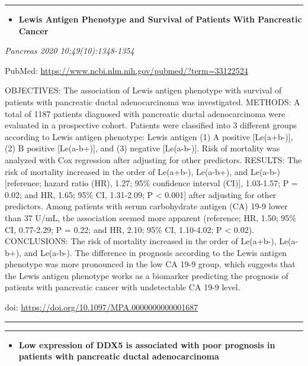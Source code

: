 \documentclass[
]{article}
\providecommand{\tightlist}{%
  \setlength{\itemsep}{0pt}\setlength{\parskip}{0pt}}
\begin{document}
\begin{center}\rule{0.5\linewidth}{0.5pt}\end{center}

\begin{itemize}
\tightlist
\item
  \textbf{Lewis Antigen Phenotype and Survival of Patients With
  Pancreatic Cancer}
\end{itemize}

\emph{Pancreas 2020 10;49(10):1348-1354}

PubMed: \url{https://www.ncbi.nlm.nih.gov/pubmed/?term=33122524}

OBJECTIVES: The association of Lewis antigen phenotype with survival of
patients with pancreatic ductal adenocarcinoma was investigated.
METHODS: A total of 1187 patients diagnosed with pancreatic ductal
adenocarcinoma were evaluated in a prospective cohort. Patients were
classified into 3 different groups according to Lewis antigen phenotype:
Lewis antigen (1) A positive {[}Le(a+b-){]}, (2) B positive
{[}Le(a-b+){]}, and (3) negative {[}Le(a-b-){]}. Risk of mortality was
analyzed with Cox regression after adjusting for other predictors.
RESULTS: The risk of mortality increased in the order of Le(a+b-),
Le(a-b+), and Le(a-b-) {[}reference; hazard ratio (HR), 1.27; 95\%
confidence interval (CI){]}, 1.03-1.57; P = 0.02; and HR, 1.65; 95\% CI,
1.31-2.09; P \textless{} 0.001{]} after adjusting for other predictors.
Among patients with serum carbohydrate antigen (CA) 19-9 lower than 37
U/mL, the association seemed more apparent (reference; HR, 1.50; 95\%
CI, 0.77-2.29; P = 0.22; and HR, 2.10; 95\% CI, 1.10-4.02; P \textless{}
0.02). CONCLUSIONS: The risk of mortality increased in the order of
Le(a+b-), Le(a-b+), and Le(a-b-). The difference in prognosis according
to the Lewis antigen phenotype was more pronounced in the low CA 19-9
group, which suggests that the Lewis antigen phenotype works as a
biomarker predicting the prognosis of patients with pancreatic cancer
with undetectable CA 19-9 level.

doi: \url{https://doi.org/10.1097/MPA.0000000000001687}

\begin{center}\rule{0.5\linewidth}{0.5pt}\end{center}

\begin{center}\rule{0.5\linewidth}{0.5pt}\end{center}

\begin{itemize}
\tightlist
\item
  \textbf{Low expression of DDX5 is associated with poor prognosis in
  patients with pancreatic ductal adenocarcinoma}
\end{itemize}
\end{document}
